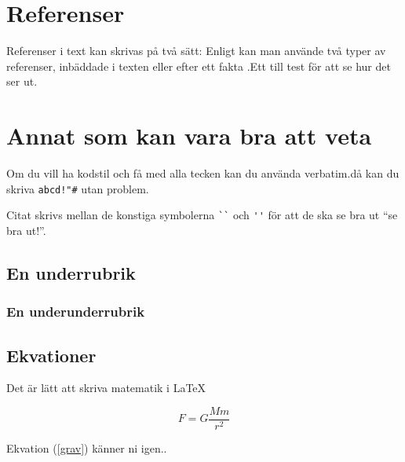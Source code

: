 \documentclass[11p]{article}
\begin{document}

    \section{Referenser}
    Referenser i text kan skrivas på två sätt: Enligt \textcite{Jens} kan man använde två typer av referenser, inbäddade i texten eller efter ett fakta \parencite{Fraenkel}.Ett till test för att se hur det ser ut\parencite[sid 55]{fermi}.

    \section{Annat som kan vara bra att veta}
    Om du vill ha kodstil och få med alla tecken kan du använda verbatim.då kan du skriva \verb|abcd!"#| utan problem.

    Citat skrivs mellan de konstiga symbolerna \verb|``| och \verb|''| för att de ska se bra ut ``se bra ut!''.
    \subsection{En underrubrik}
    \subsubsection{En underunderrubrik}
    \subsection{Ekvationer}
    Det är lätt att skriva matematik i \LaTeX

    \begin{equation}
        F = G \frac{M m}{r^2}
        \label{grav}
    \end{equation}

    Ekvation (\ref{grav}) känner ni igen..
\end{document}
